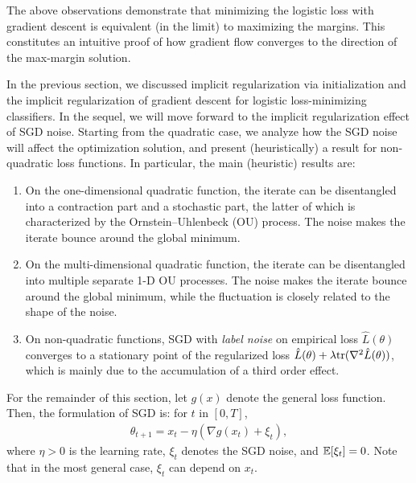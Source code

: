 The above observations demonstrate that minimizing the logistic loss with gradient descent is equivalent (in the limit) to maximizing the margins. This constitutes an intuitive proof of how gradient flow converges to the direction of the max-margin solution.


In the previous section, we discussed implicit regularization via initialization and the implicit regularization of gradient descent for logistic loss-minimizing classifiers. 
In the sequel, we will move forward to the implicit regularization effect of SGD noise. Starting from the quadratic case, we analyze how the SGD noise will affect the optimization solution, and present (heuristically) a result for non-quadratic loss functions. In particular, the main (heuristic) results are:
\begin{enumerate}
\item On the one-dimensional quadratic function, the iterate can be disentangled into a contraction part and a stochastic part, the latter of which is characterized by the Ornstein–Uhlenbeck (OU) process. The noise makes the iterate bounce around the global minimum.
\item On the multi-dimensional quadratic function, the iterate can be disentangled into multiple separate 1-D OU processes. The noise makes the iterate bounce around the global minimum, while the fluctuation is closely related to the shape of the noise.
\item On non-quadratic functions, SGD with \textit{label noise} on empirical loss $\hat{L}(\theta)$ converges to a stationary point of the regularized loss $\hat{L}(\theta) + \lambda \textup{tr}(\nabla^2\hat{L}(\theta))$, which is mainly due to the accumulation of a third order effect.
\end{enumerate}
 

For the remainder of this section, let $g(x)$ denote the general loss function. Then, the formulation of SGD is: for $t$ in $[0,T]$,
\begin{align}
\theta_{t+1} = x_{t} - \eta(\nabla g(x_{t}) + \xi_t),
\end{align} 
where $\eta > 0$ is the learning rate, $\xi_t$ denotes the SGD noise, and $\operatorname*{\mathbb{E}}[\xi_t] = 0$. Note that in the most general case, $\xi_t$ can depend on $x_t$.
	

